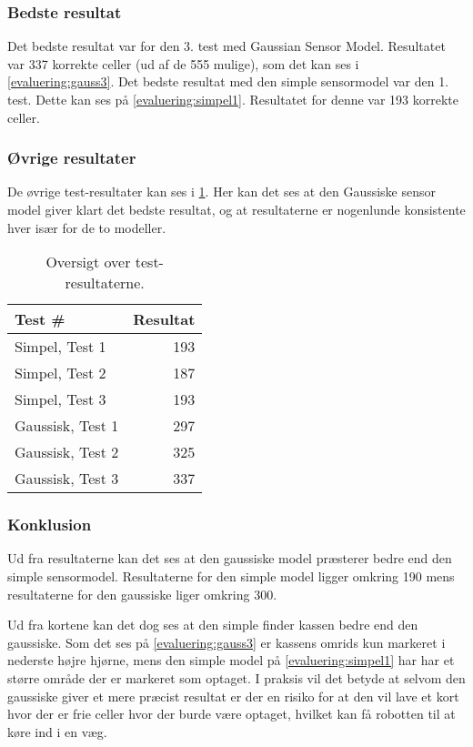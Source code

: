 \subsubsection*{Bedste resultat}
Det bedste resultat var for den 3. test med Gaussian Sensor Model.
Resultatet var 337 korrekte celler (ud af de 555 mulige), som det kan ses i \cref{evaluering:gauss3}. 
Det  bedste resultat med den simple sensormodel var den 1. test. 
Dette kan ses på \cref{evaluering:simpel1}.
Resultatet for denne var 193 korrekte celler.

\subsubsection*{Øvrige resultater}
De øvrige test-resultater kan ses i \cref{evaluering:testresultater}.
Her kan det ses at den Gaussiske sensor model giver klart det bedste resultat, og at resultaterne er nogenlunde konsistente hver især for de to modeller.

\begin{table}[h]
\centering
\begin{tabular}{|l|r|}
\hline
\textbf{Test \#} & \textbf{Resultat} \\ \hline \hline
Simpel, Test 1 & 193 \\ \hline
Simpel, Test 2 & 187 \\ \hline
Simpel, Test 3 & 193 \\ \hline \hline
Gaussisk, Test 1 & 297 \\ \hline
Gaussisk, Test 2 & 325 \\ \hline
Gaussisk, Test 3 & 337 \\ \hline
\end{tabular}
\caption{Oversigt over test-resultaterne.}
\label{evaluering:testresultater}
\end{table}

\subsubsection*{Konklusion}
Ud fra resultaterne kan det ses at den gaussiske model præsterer bedre end den simple sensormodel. 
Resultaterne for den simple model ligger omkring 190 mens resultaterne for den gaussiske liger omkring 300.

Ud fra kortene kan det dog ses at den simple finder kassen bedre end den gaussiske.
Som det ses på \cref{evaluering:gauss3} er kassens omrids kun markeret i nederste højre hjørne, mens den simple model på \cref{evaluering:simpel1} har har et større område der er markeret som optaget.
I praksis vil det betyde at selvom den gaussiske giver et mere præcist resultat er der en risiko for at den vil lave et kort hvor der er frie celler hvor der burde være optaget, hvilket kan få robotten til at køre ind i en væg.
